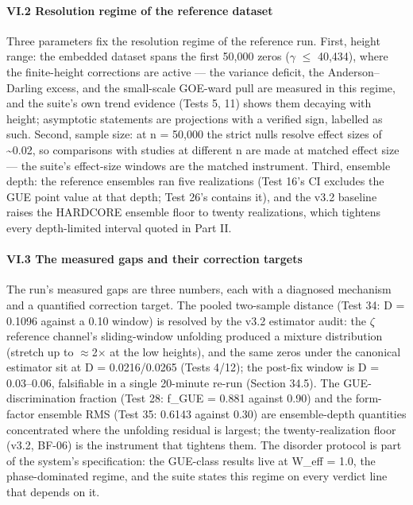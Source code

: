 \documentclass[10pt]{article}
\begin{document}
\paragraph{VI.2 Resolution regime of the reference dataset}

Three parameters fix the resolution regime of the reference run. First, height range: the embedded dataset spans the first 50,000 zeros ($\gamma$ $\le$ 40,434), where the finite-height corrections are active --- the variance deficit, the Anderson--Darling excess, and the small-scale GOE-ward pull are measured in this regime, and the suite's own trend evidence (Tests 5, 11) shows them decaying with height; asymptotic statements are projections with a verified sign, labelled as such. Second, sample size: at n = 50,000 the strict nulls resolve effect sizes of \textasciitilde{}0.02, so comparisons with studies at different n are made at matched effect size --- the suite's effect-size windows are the matched instrument. Third, ensemble depth: the reference ensembles ran five realizations (Test 16's CI excludes the GUE point value at that depth; Test 26's contains it), and the v3.2 baseline raises the HARDCORE ensemble floor to twenty realizations, which tightens every depth-limited interval quoted in Part II.

\paragraph{VI.3 The measured gaps and their correction targets}

The run's measured gaps are three numbers, each with a diagnosed mechanism and a quantified correction target. The pooled two-sample distance (Test 34: D = 0.1096 against a 0.10 window) is resolved by the v3.2 estimator audit: the $\zeta$ reference channel's sliding-window unfolding produced a mixture distribution (stretch up to $\approx$2$\times$ at the low heights), and the same zeros under the canonical estimator sit at D = 0.0216/0.0265 (Tests 4/12); the post-fix window is D = 0.03--0.06, falsifiable in a single 20-minute re-run (Section 34.5). The GUE-discrimination fraction (Test 28: f\_GUE = 0.881 against 0.90) and the form-factor ensemble RMS (Test 35: 0.6143 against 0.30) are ensemble-depth quantities concentrated where the unfolding residual is largest; the twenty-realization floor (v3.2, BF-06) is the instrument that tightens them. The disorder protocol is part of the system's specification: the GUE-class results live at W\_eff = 1.0, the phase-dominated regime, and the suite states this regime on every verdict line that depends on it.
\end{document}
